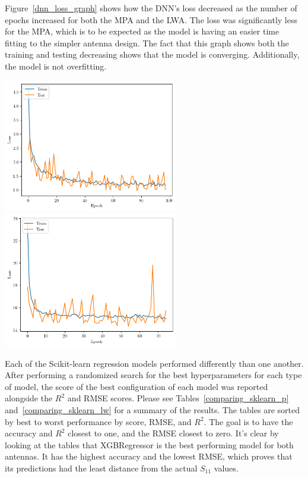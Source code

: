 \documentclass[conference]{IEEEtran}
\newenvironment{Figure}
    {\par\medskip\noindent\minipage{\linewidth}}
    {\endminipage\par\medskip}
\begin{document}
Figure~\ref{dnn_loss_graph} shows how the DNN's loss decreased as the number of epochs increased for both the MPA and the LWA. The loss was significantly less for the MPA, which is to be expected as the model is having an easier time fitting to the simpler antenna design. The fact that this graph shows both the training and testing decreasing shows that the model is converging. Additionally, the model is not overfitting. 

\begin{Figure}
    \centering
    \includegraphics[width=3in]{loss}
    \includegraphics[width=3in]{loss_lw}
    \label{dnn_loss_graph}
\end{Figure}

Each of the Scikit-learn regression models performed differently than one another. After performing a randomized search for the best hyperparameters for each type of model, the score of the best configuration of each model was reported alongside the $R^2$ and RMSE scores. Please see Tables~\ref{comparing_sklearn_p} and~\ref{comparing_sklearn_lw} for a summary of the results. The tables are sorted by best to worst performance by score, RMSE, and $R^2$. The goal is to have the accuracy and $R^2$ closest to one, and the RMSE closest to zero. It's clear by looking at the tables that XGBRegressor is the best performing model for both antennas. It has the highest accuracy and the lowest RMSE, which proves that its predictions had the least distance from the actual $S_{11}$ values. 
\end{document}
